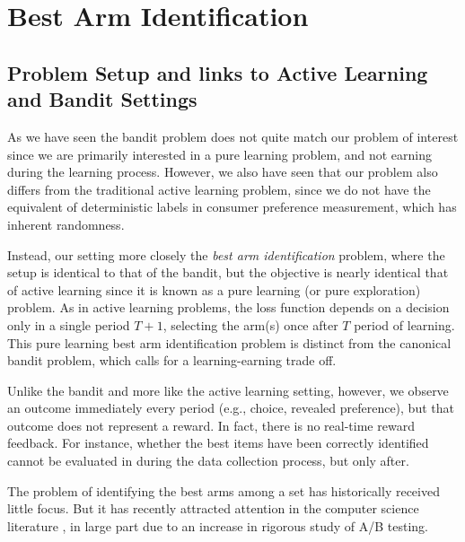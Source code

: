 \documentclass[nonblindrev]{informs3}
\begin{document}
\section{Best Arm Identification}

\subsection{Problem Setup and links to Active Learning and Bandit Settings}

As we have seen the bandit problem does not quite match our problem of interest since we are primarily interested in a pure learning problem, and not earning during the learning process. However, we also have seen that our problem also differs from the traditional active learning problem, since we do not have the equivalent of deterministic labels in consumer preference measurement, which has inherent randomness. 

Instead, our setting more closely the \emph{best arm identification} problem, where the setup is identical to that of the bandit, but the objective is nearly identical that of active learning since it is known as a pure learning (or pure exploration) problem. As in active learning problems, the loss function depends on a decision only in a single period $T+1$, selecting the arm(s) once after $T$ period of learning. This pure learning best arm identification problem is distinct from the canonical bandit problem, which calls for a learning-earning trade off. 

Unlike the bandit and more like the active learning setting, however, we observe an outcome immediately every period (e.g., choice, revealed preference), but that outcome does not represent a reward. In fact, there is no real-time reward feedback. For instance, whether the best items have been correctly identified cannot be evaluated in during the data collection process, but only after.

The problem of identifying the best arms among a set has historically received little focus. But it has recently attracted attention in the computer science literature \citep{gabillon2012best,jamieson2014lil,kalyanakrishnan2012pac,kaufmann2016complexity,kaufmann2013information,russo2018simple}, in large part due to an increase in rigorous study of A/B testing. 

\end{document}
